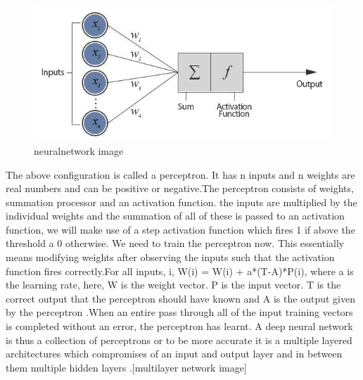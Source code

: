\documentclass[sigconf]{acmart}
\begin{document}
\begin{figure}[!ht]
  \centering\includegraphics[width=\columnwidth]{images/neuralnet.jpg}
  \caption{neuralnetwork image}\label{f:neuralnet}
\end{figure} 
The above configuration is called a perceptron. It has n inputs and n weights are real numbers and can be positive or negative.The perceptron consists of weights, summation processor and an activation function. the inputs are multiplied by the individual weights and the summation of all of these is passed to an activation function, we will make use of a step activation function which fires 1 if above the threshold a 0 otherwise\cite{wikip[edia2017}. We need to train the perceptron now. This essentially means modifying weights after observing the inputs such that the activation function fires correctly.For all inputs, i, W(i) = W(i) + a*(T-A)*P(i), where a is the learning rate, here, W is the weight vector. P is the input vector. T is the correct output that the perceptron should have known and A is the output given by the perceptron \cite{wikip[edia2017}.When an entire pass through all of the input training vectors is completed without an error, the perceptron has learnt. A deep neural network is thus a collection of perceptrons or to be more accurate it is a multiple layered architectures which compromises of an input and output layer and in between them multiple hidden layers \cite{2017}.[multilayer network image]
\end{document}
